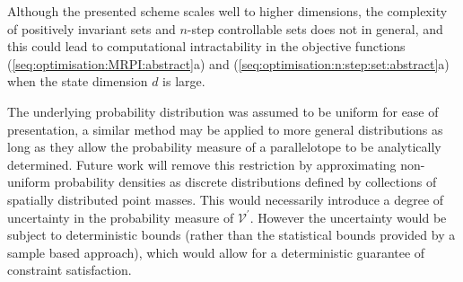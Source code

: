 \documentclass{ifacconf}
\providecommand{\V}{\mathcal V}
\begin{document}
Although the presented scheme scales well to higher dimensions, the complexity of positively invariant sets and $n$-step controllable sets does not in general, and this could lead to computational intractability in the objective functions (\ref{seq:optimisation:MRPI:abstract}a) and (\ref{seq:optimisation:n:step:set:abstract}a) when the state dimension $d$ is large.
%

The underlying probability distribution was assumed to be uniform for ease of presentation, a similar method may be applied to more general distributions as long as they allow the probability measure of a parallelotope to be analytically determined.
%
Future work will remove this restriction by approximating non-uniform probability densities as discrete distributions defined by collections of spatially distributed point masses.
%
This would necessarily introduce a degree of uncertainty in the probability measure of $\V^\prime$. However the uncertainty would be subject to deterministic bounds (rather than the statistical bounds provided by a sample based approach), which would allow for a deterministic guarantee of constraint satisfaction. 



%

\end{document}
